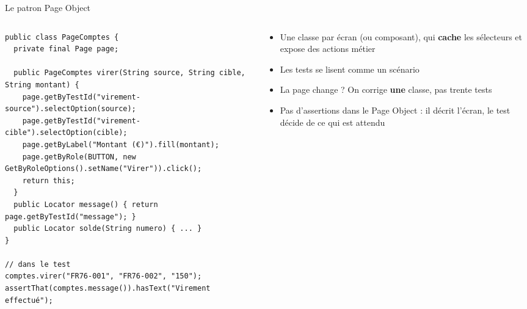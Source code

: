 \documentclass[aspectratio=169,10pt]{beamer}
\begin{document}
\begin{frame}[fragile]{Le patron Page Object}
  \begin{columns}[T]
    \begin{column}{0.62\textwidth}
\begin{lstlisting}[basicstyle=\lstcode\scriptsize]
public class PageComptes {
  private final Page page;

  public PageComptes virer(String source, String cible, String montant) {
    page.getByTestId("virement-source").selectOption(source);
    page.getByTestId("virement-cible").selectOption(cible);
    page.getByLabel("Montant (€)").fill(montant);
    page.getByRole(BUTTON, new GetByRoleOptions().setName("Virer")).click();
    return this;
  }
  public Locator message() { return page.getByTestId("message"); }
  public Locator solde(String numero) { ... }
}

// dans le test
comptes.virer("FR76-001", "FR76-002", "150");
assertThat(comptes.message()).hasText("Virement effectué");
\end{lstlisting}
    \end{column}
    \begin{column}{0.35\textwidth}
      \small
      \begin{itemize}
        \item Une classe par écran (ou composant), qui \textbf{cache} les sélecteurs et expose des actions métier
        \item Les tests se lisent comme un scénario
        \item La page change ? On corrige \textbf{une} classe, pas trente tests
        \item Pas d'assertions dans le Page Object : il décrit l'écran, le test décide de ce qui est attendu
      \end{itemize}
    \end{column}
  \end{columns}
\end{frame}
\end{document}
